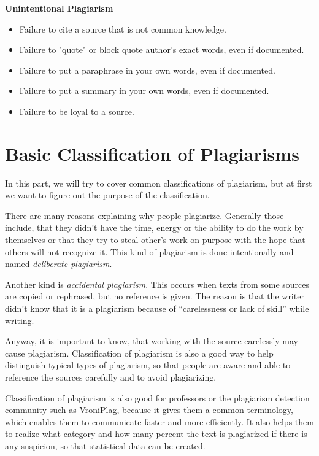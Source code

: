 \textbf{Unintentional Plagiarism}
\begin{itemize}
\item Failure to cite a source that is not common knowledge.
\item Failure to "quote" or block quote author's exact words, even if documented.
\item Failure to put a paraphrase in your own words, even if documented.
\item Failure to put a summary in your own words, even if documented.
\item Failure to be loyal to a source.
\end{itemize}




	
	
\section{Basic Classification of Plagiarisms}

In this part, we will try to cover common classifications of plagiarism, but at first we want to figure out the purpose of 
the classification. 

There are many reasons explaining why people plagiarize. Generally those include, that they didn't have the time,
energy or the ability to do the work by themselves or that they try to steal other’s work on purpose with the hope that 
others
will not recognize it. This kind of plagiarism is done intentionally and named \textit{deliberate 
plagiarism}\citep{UEfAP}.

Another kind is \textit{accidental plagiarism}. This occurs when texts from some sources are copied or rephrased, but no 
reference is given. The reason is that the writer didn't know that it is a plagiarism because of \enquote{carelessness or  
lack of skill}\citep{UEfAP} while writing.

Anyway, it is important to know, that working with the source carelessly may cause plagiarism. Classification 
of plagiarism is also a good way to help distinguish typical types of plagiarism, so that people are aware and able 
to reference the sources carefully and to avoid plagiarizing.

Classification of plagiarism is also good for professors or the plagiarism detection community such as VroniPlag, because
it gives them a common terminology, which enables them to communicate faster and more efficiently. 
It also helps them to realize what category and how many percent the text is plagiarized 
if there is any suspicion, so that statistical data can be created.


